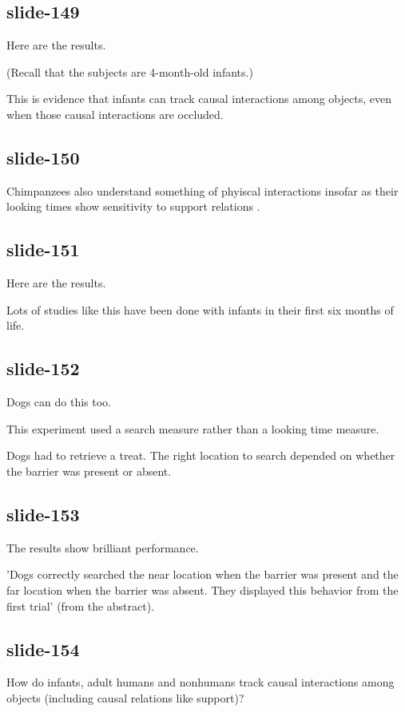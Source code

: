 \documentclass[12pt,\papersize]{extarticle}
\begin{document}
\subsection{slide-149}
Here are the results.
 
(Recall that the subjects are 4-month-old infants.)
 
This is evidence that infants can track causal interactions among objects, even when those causal interactions are occluded.
 
\subsection{slide-150}
Chimpanzees also understand something of phyiscal interactions insofar as their looking times show sensitivity to support relations \citep{cacchione:2004_recognizing}.
 
\subsection{slide-151}
Here are the results.
 
Lots of studies like this have been done with infants in their first six months of life.
 
\subsection{slide-152}
Dogs can do this too.
 
This experiment used a search measure rather than a looking time measure.
 
Dogs had to retrieve a treat.  The right location to search depended on whether the barrier was present or absent.
 
\subsection{slide-153}
The results show brilliant performance.
 
'Dogs correctly searched the near location when the barrier was present and the far location when the barrier was absent. They displayed this behavior from the first trial' \citep{kundey:2010_domesticated} (from the abstract).
 
\subsection{slide-154}
How do infants, adult humans and nonhumans track causal interactions among objects (including causal relations like support)?
 
\end{document}

